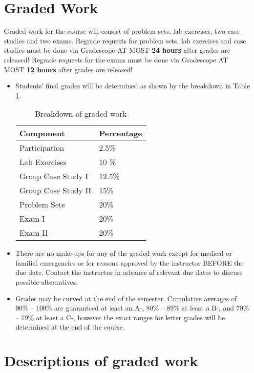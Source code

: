 \documentclass[11pt, a4paper]{article}
\begin{document}
\section{Graded Work} 
Graded work for the course will consist of problem sets, lab exercises, two case studies and two exams. Regrade requests for problem sets, lab exercises and case studies must be done via Gradescope AT MOST \textbf{24 hours} after grades are released! Regrade requests for the exams must be done via Gradescope AT MOST \textbf{12 hours} after grades are released!
\begin{itemize}[label= {\color{darkblue}{\ArrowBoldRightStrobe}}]
		\item Students' final grades will be determined as shown by the breakdown in Table \ref{gradedwork}.
	\begin{table}[h]
		\centering
		\caption{Breakdown of graded work} \label{gradedwork}
		\begin{tabular}{ll}
			Component & Percentage \\ 
			\hline
			Participation & 2.5\% \\
			Lab Exercises & 10 \% \\
			Group Case Study I & 12.5\% \\
			Group Case Study II & 15\% \\
			Problem Sets & 20\% \\
			Exam I & 20\% \\ 
			Exam II & 20\% \\
			\hline 
		\end{tabular}
	\end{table}
	
	\item There are no make-ups for any of the graded work except for medical or familial emergencies or for reasons approved by the instructor BEFORE the due date. Contact the instructor in advance of relevant due dates to discuss possible alternatives. 
	
	\item Grades may be curved at the end of the semester. Cumulative averages of 90\% -- 100\% are guaranteed at least an A-, 80\% -- 89\% at least a B-, and 70\% -- 79\% at least a C-, however the exact ranges for letter grades will be determined at the end of the course.
\end{itemize}


\section{Descriptions of graded work}
\end{document}
